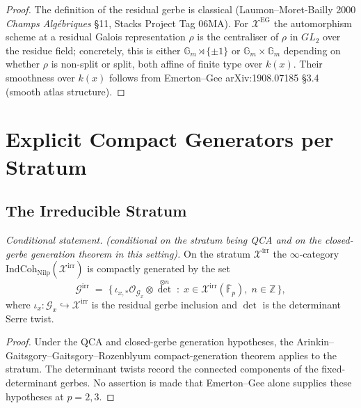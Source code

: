 \begin{proof}
The definition of the residual gerbe is classical
(Laumon--Moret-Bailly 2000 \emph{Champs Alg\'ebriques} \S 11,
Stacks Project Tag 06MA). For \(\mathcal{X}^{\mathrm{EG}}\) the
automorphism scheme at a residual Galois representation \(\rho\) is
the centraliser of \(\rho\) in \(GL_{2}\) over the residue field;
concretely, this is either \(\mathbb{G}_{m}\rtimes\{\pm 1\}\) or
\(\mathbb{G}_{m}\times\mathbb{G}_{m}\) depending on whether \(\rho\) is
non-split or split, both affine of finite type over \(k(x)\). Their
smoothness over \(k(x)\) follows from Emerton--Gee arXiv:1908.07185
\S 3.4 (smooth atlas structure).
\end{proof}

\section{Explicit Compact Generators per Stratum}
\label{v4-arith:w5-g:f1a3-C:compact-generators}

\subsection{The Irreducible Stratum}

\begin{proposition}
\label{v4-arith:w5-g:f1a3-C:prop:compact-gen-irr}
\emph{Conditional statement.} \emph{(conditional on the stratum
being QCA and on the closed-gerbe generation theorem in this setting).}
On the stratum \(\mathcal{X}^{\mathrm{irr}}\)
the \(\infty\)-category
\(\mathrm{IndCoh}_{\mathrm{Nilp}}(\mathcal{X}^{\mathrm{irr}})\) is
compactly generated by the set
\[
\mathcal{G}^{\mathrm{irr}}
\;=\;\bigl\{\,\iota_{x,*}\mathcal{O}_{\mathcal{G}_{x}}\otimes\det^{\otimes n}\;:\;x\in\mathcal{X}^{\mathrm{irr}}(\overline{\mathbb{F}}_{p}),\;n\in\mathbb{Z}\,\bigr\},
\]
where \(\iota_{x}\colon\mathcal{G}_{x}\hookrightarrow\mathcal{X}^{\mathrm{irr}}\)
is the residual gerbe inclusion and \(\det\) is the determinant Serre twist.
\end{proposition}

\begin{proof}
Under the QCA and closed-gerbe generation hypotheses, the
Arinkin--Gaitsgory--Gaitsgory--Rozenblyum compact-generation theorem
applies to the stratum. The determinant twists record the connected
components of the fixed-determinant gerbes. No assertion is made that
Emerton--Gee alone supplies these hypotheses at \(p=2,3\).
\end{proof}

